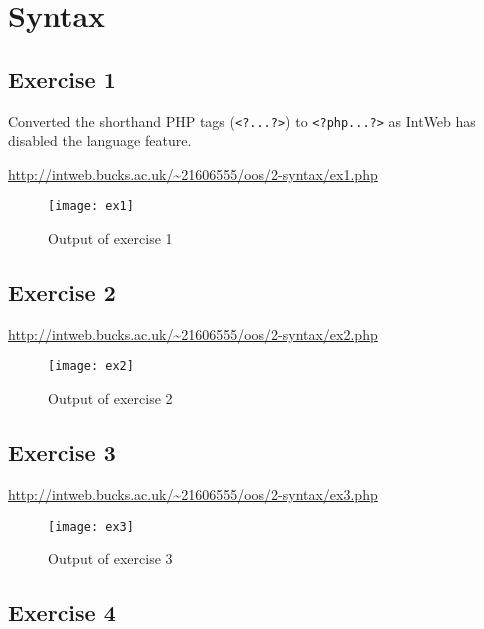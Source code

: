 \chapter{Syntax}
\graphicspath{{2-syntax/images/}}

\section{Exercise 1}

Converted the shorthand PHP tags (\texttt{<?...?>}) to \texttt{<?php...?>} as IntWeb has disabled the language feature.

\url{http://intweb.bucks.ac.uk/~21606555/oos/2-syntax/ex1.php}
\captionsetup{type=figure}


\begin{figure}[H]
  \caption{Output of exercise 1}
  \centering
  \texttt{[image: ex1]}
\end{figure}

\section{Exercise 2}

\url{http://intweb.bucks.ac.uk/~21606555/oos/2-syntax/ex2.php}
\captionsetup{type=figure}


\begin{figure}[H]
  \caption{Output of exercise 2}
  \centering
  \texttt{[image: ex2]}
\end{figure}

\section{Exercise 3}

\url{http://intweb.bucks.ac.uk/~21606555/oos/2-syntax/ex3.php}
\captionsetup{type=figure}


\begin{figure}[H]
  \caption{Output of exercise 3}
  \centering
  \texttt{[image: ex3]}
\end{figure}

\section{Exercise 4}

